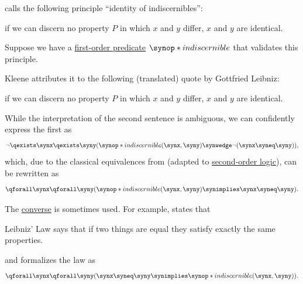 \begin{remark}\label{rem:identity_of_indiscernibles}
  \textcite[163]{Kleene2002Logic} calls the following principle \enquote{identity of indiscernibles}:
  \begin{displayquote}
    \textellipsis if we can discern no property \( P \) in which \( x \) and \( y \) differ, \( x \) and \( y \) are identical.
  \end{displayquote}

  Suppose we have a \hyperref[def:fol_signature/predicate]{first-order predicate} \( \synop*{indiscernible} \) that validates this principle.

  Kleene attributes it to the following (translated) quote by Gottfried Leibniz:
  \begin{displayquote}
    \textellipsis if we can discern no property \( P \) in which \( x \) and \( y \) differ, \( x \) and \( y \) are identical.
  \end{displayquote}

  While the interpretation of the second sentence is ambiguous, we can confidently express the first as
  \begin{equation*}
    \neg \qexists \synx \qexists \syny (\synop*{indiscernible}(\synx, \syny) \synwedge \neg (\synx \syneq \syny)),
  \end{equation*}
  which, due to the classical equivalences from  (adapted to \hyperref[def:second_order_logic]{second-order logic}), can be rewritten as
  \begin{equation}\label{eq:rem:identity_of_indiscernibles/forward}
    \qforall \synx \qforall \syny (\synop*{indiscernible}(\synx, \syny) \synimplies \synx \syneq \syny).
  \end{equation}

  The \hyperref[def:conditional_formula/converse]{converse} is sometimes used. For example, \textcite[278]{Farmer2008STTVirtues} states that
  \begin{displayquote}
    Leibniz' Law says that if two things are equal they satisfy exactly the same properties.
  \end{displayquote}
  and formalizes the law as
  \begin{equation}\label{eq:rem:identity_of_indiscernibles/backward}
    \qforall \synx \qforall \syny (\synx \syneq \syny \synimplies \synop*{indiscernible}(\synx, \syny)).
  \end{equation}


\end{remark}
